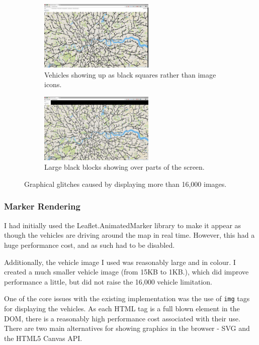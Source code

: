 \documentclass[ %
                    author={Alexander Hill},
                supervisor={Dr. Benjamin Sach},
                    degree={MEng},
                     title={MARMOSET},
                  subtitle={Multi-Agent Route Management using Online Simulation for Efficient Transportation},
                      type={research},
                      year={2016} ]{dissertation}
\begin{document}
\begin{figure}[h]
\centering
\begin{subfigure}[b]{0.4\textwidth}
    \centering
    \includegraphics[height=9em]{glitches-car}
    \caption{Vehicles showing up as black squares rather than image icons.}\label{fig:glitches-car}
\end{subfigure}
\hspace{3em}
\begin{subfigure}[b]{0.4\textwidth}
    \centering
    \includegraphics[height=9em]{glitches-chrome}
    \caption{Large black blocks showing over parts of the screen.}\label{fig:glitches-chrome}
\end{subfigure}
\caption{Graphical glitches caused by displaying more than 16,000 images.}
\end{figure}

\subsubsection{Marker Rendering}

I had initially used the Leaflet.AnimatedMarker library to make it appear as
though the vehicles are driving around the map in real time. However, this had a
huge performance cost, and as such had to be disabled.

Additionally, the vehicle image I used was reasonably large and in colour. I
created a much smaller vehicle image (from 15KB to 1KB.), which did improve
performance a little, but did not raise the 16,000 vehicle limitation.

One of the core issues with the existing implementation was the use of
\texttt{img} tags for displaying the vehicles. As each HTML tag is a full blown
element in the DOM, there is a reasonably high performance cost associated with
their use. There are two main alternatives for showing graphics in the browser -
SVG and the HTML5 Canvas API.
\end{document}
